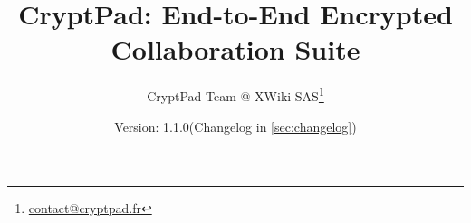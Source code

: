\documentclass[a4paper, 11pt, twocolumn]{article}
\begin{document}


\newcommand{\myAlgofont}[1]{\ifmmode\mathsf{{#1}}\else\textsf{{#1}}\fi\xspace}
\newcommand{\myHash}[1]{\ensuremath{\myAlgofont{H}({#1})}}
\newcommand{\myKGen}[2][]{\ensuremath{\myAlgofont{KGen}\ifthenelse{\equal{#1}{}}{}{#1}({#2})}}
\newcommand{\mypwd}{\myAlgofont{pwd}}
\newcommand{\mySalt}{\myAlgofont{salt}}
\newcommand{\myUsername}{\myAlgofont{user name}}
\newcommand{\myseed}{\myAlgofont{seed}}
\newcommand{\mychanID}{\myAlgofont{chanID}}
\newcommand{\mySuperseed}{\myAlgofont{superseed}}
\newcommand{\myViewKeyStr}{\myAlgofont{viewKeyStr}}
\newcommand{\myFileKeyStr}{\myAlgofont{fileKeyStr}}
\newcommand{\myEditKeyStr}{\myAlgofont{editKeyStr}}
\newcommand{\myPK}{\myAlgofont{PK}}
\newcommand{\mySK}{\myAlgofont{SK}}
\newcommand{\myKeyPair}[1]{\ensuremath{(\myPK{#1}, \mySK{#1})}\xspace}
\newcommand{\mySymKey}{\myAlgofont{K}}
\newcommand{\mySymEnc}[2]{\ensuremath{\myAlgofont{SymEnc}({#1}, {#2})}}
\newcommand{\myASymEnc}[1]{\ensuremath{\myAlgofont{ASymEnc}({#1})}}
\newcommand{\myCtxt}{\ensuremath{c}}
\newcommand{\mySig}{\ensuremath{sig}}
\newcommand{\myKDF}[2]{\ensuremath{\myAlgofont{KDF}({#1}, {#2})}}
\newcommand{\mySign}[2]{\myAlgofont{Sign}({#1}, {#2})}

\author{CryptPad Team @ XWiki SAS\footnote{ \href{mailto:contact@cryptpad.fr}{contact@cryptpad.fr}}}

\title{CryptPad: End-to-End Encrypted Collaboration Suite}

\newcommand{\myCryptPadVersion}{5.1.0\xspace}

\newcommand{\myDocVersion}{1.1.0\xspace}

\date{Version: \myDocVersion (Changelog in \cref{sec:changelog})}
\maketitle














\printbibliography

\appendix


\end{document}
